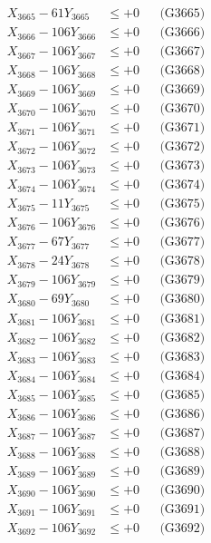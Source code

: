 \documentclass[a4paper,10pt]{article}
\begin{document}
{\begin{align}
X_{3665} - 61Y_{3665} &\leq +0 && \text{(G3665)} \\
X_{3666} - 106Y_{3666} &\leq +0 && \text{(G3666)} \\
X_{3667} - 106Y_{3667} &\leq +0 && \text{(G3667)} \\
X_{3668} - 106Y_{3668} &\leq +0 && \text{(G3668)} \\
X_{3669} - 106Y_{3669} &\leq +0 && \text{(G3669)} \\
X_{3670} - 106Y_{3670} &\leq +0 && \text{(G3670)} \\
\allowbreak
X_{3671} - 106Y_{3671} &\leq +0 && \text{(G3671)} \\
X_{3672} - 106Y_{3672} &\leq +0 && \text{(G3672)} \\
X_{3673} - 106Y_{3673} &\leq +0 && \text{(G3673)} \\
X_{3674} - 106Y_{3674} &\leq +0 && \text{(G3674)} \\
X_{3675} - 11Y_{3675} &\leq +0 && \text{(G3675)} \\
X_{3676} - 106Y_{3676} &\leq +0 && \text{(G3676)} \\
X_{3677} - 67Y_{3677} &\leq +0 && \text{(G3677)} \\
X_{3678} - 24Y_{3678} &\leq +0 && \text{(G3678)} \\
X_{3679} - 106Y_{3679} &\leq +0 && \text{(G3679)} \\
X_{3680} - 69Y_{3680} &\leq +0 && \text{(G3680)} \\
\allowbreak
X_{3681} - 106Y_{3681} &\leq +0 && \text{(G3681)} \\
X_{3682} - 106Y_{3682} &\leq +0 && \text{(G3682)} \\
X_{3683} - 106Y_{3683} &\leq +0 && \text{(G3683)} \\
X_{3684} - 106Y_{3684} &\leq +0 && \text{(G3684)} \\
X_{3685} - 106Y_{3685} &\leq +0 && \text{(G3685)} \\
X_{3686} - 106Y_{3686} &\leq +0 && \text{(G3686)} \\
X_{3687} - 106Y_{3687} &\leq +0 && \text{(G3687)} \\
X_{3688} - 106Y_{3688} &\leq +0 && \text{(G3688)} \\
X_{3689} - 106Y_{3689} &\leq +0 && \text{(G3689)} \\
X_{3690} - 106Y_{3690} &\leq +0 && \text{(G3690)} \\
\allowbreak
X_{3691} - 106Y_{3691} &\leq +0 && \text{(G3691)} \\
X_{3692} - 106Y_{3692} &\leq +0 && \text{(G3692)} \\

\end{align}}
\end{document}
